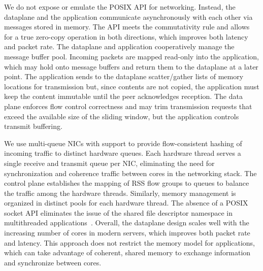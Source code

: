  We do
not expose or emulate the POSIX API for networking.  Instead, the
dataplane and the application communicate asynchronously with each
other via messages stored in
memory. %
The API meets the commutativity rule and allows for a true zero-copy
operation in both directions, which improves both latency and packet
rate. The dataplane and application cooperatively manage the message
buffer pool. Incoming packets are mapped read-only into the
application, which may hold onto message buffers and return them to
the dataplane at a later point.  The application sends to the
dataplane scatter/gather lists of memory locations for transmission
but, since contents are not copied, the application must keep the
content immutable until the peer acknowledges reception. The
data plane enforces flow control correctness and may trim transmission
requests that exceed the available size of the sliding window, but
the application controls transmit buffering.

 We use
multi-queue NICs with  support to provide flow-consistent hashing
of incoming traffic to distinct hardware queues. Each hardware
thread serves a single receive and transmit queue per NIC, eliminating
the need for synchronization and
coherence traffic between cores in the networking stack.  The control
plane establishes the mapping of RSS flow groups to queues to balance
the traffic among the hardware threads.  Similarly, memory management
is organized in distinct pools for each hardware thread. The absence
of a POSIX socket API eliminates the issue of the shared file
descriptor namespace in multithreaded
applications~\cite{DBLP:conf/sosp/ClementsKZMK13}. Overall, the \ix
dataplane design scales well with the increasing number of cores in
modern servers, which improves both packet rate and latency. This
approach does not restrict the memory model for applications, which
can take advantage of coherent, shared memory to exchange information and
synchronize between cores.

